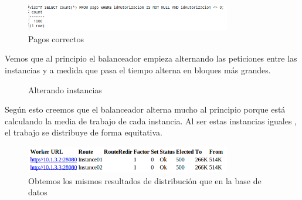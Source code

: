 \documentclass[a4paper, 10pt]{article}
\begin{document}
\begin{figure}[hbtp]
	\centering
	\includegraphics[width=0.8\textwidth]{../../P3/pantallazos/ej9_pagos_correctos.png}
	\caption { Pagos correctos }
\end{figure}

Vemos que al principio el balanceador empieza alternando las peticiones entre las instancias y a medida que pasa el tiempo alterna en bloques más grandes.

\begin{figure}[htbp]
	\centering
	\caption{Alterando instancias}
\end{figure}

Según esto creemos que el balanceador alterna mucho al principio porque está calculando la media de trabajo de cada instancia. Al ser estas instancias iguales , el trabajo se distribuye de forma equitativa.

\begin{figure}[hbtp]
	\centering
	\includegraphics[width=0.8\textwidth]{../../P3/pantallazos/ej9_manager.png}
	\caption { Obtemos los mismos resultados de distribución que en la base de datos }
\end{figure}
\end{document}
